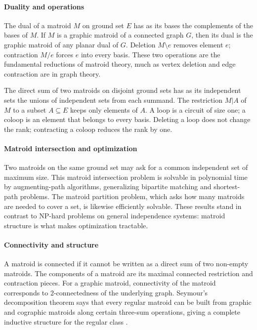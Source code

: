 \paragraph{Duality and operations}
The dual of a matroid $M$ on ground set $E$ has as its bases the complements of the bases of $M$. If $M$ is a graphic matroid of a connected graph $G$, then its dual is the graphic matroid of any planar dual of $G$. Deletion $M\setminus e$ removes element $e$; contraction $M/e$ forces $e$ into every basis. These two operations are the fundamental reductions of matroid theory, much as vertex deletion and edge contraction are in graph theory.

The direct sum of two matroids on disjoint ground sets has as its independent sets the unions of independent sets from each summand. The restriction $M|A$ of $M$ to a subset $A\subseteq E$ keeps only elements of $A$. A loop is a circuit of size one; a coloop is an element that belongs to every basis. Deleting a loop does not change the rank; contracting a coloop reduces the rank by one.

\paragraph{Matroid intersection and optimization}
Two matroids on the same ground set may ask for a common independent set of maximum size. This matroid intersection problem is solvable in polynomial time by augmenting-path algorithms, generalizing bipartite matching and shortest-path problems. The matroid partition problem, which asks how many matroids are needed to cover a set, is likewise efficiently solvable. These results stand in contrast to NP-hard problems on general independence systems: matroid structure is what makes optimization tractable.

\paragraph{Connectivity and structure}
A matroid is connected if it cannot be written as a direct sum of two non-empty matroids. The components of a matroid are its maximal connected restriction and contraction pieces. For a graphic matroid, connectivity of the matroid corresponds to 2-connectedness of the underlying graph. Seymour's decomposition theorem says that every regular matroid can be built from graphic and cographic matroids along certain three-sum operations, giving a complete inductive structure for the regular class \cite{matroid_theory_ref2}.

